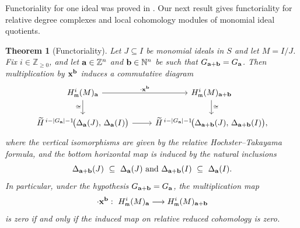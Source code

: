 \documentclass[12pt]{amsart}
\numberwithin{equation}{section}
\newtheorem{theorem}{Theorem}[section]
\theoremstyle{definition}
\theoremstyle{definition}
\def\a{{\bold a}}
\def\b{{\bold b}}
\def\x{{\bold x}}
\begin{document}
Functoriality for one ideal was proved in \cite{MN2011}. Our next result gives functoriality for relative degree complexes and local cohomology modules of monomial ideal quotients.

\begin{theorem}[Functoriality]\label{MainLem}
	Let $J\subseteq I$ be monomial ideals in $S$ and let $M = I/J$.
	Fix $i\in\mathbb Z_{\ge 0}$, and let $\a\in\mathbb Z^n$ and $\b\in\mathbb N^n$ be such that $G_{\a+\b} = G_\a$.
	Then multiplication by $\x^\b$ induces a commutative diagram
	\[
	\begin{tikzcd}
		H^i_{\mathfrak m}(M)_\a
		\arrow[r,"{\cdot \x^\b}"]
		\arrow[d,"\cong"']
		&
		H^i_{\mathfrak m}(M)_{\a+\b}
		\arrow[d,"\cong"]
		\\
		\widetilde H^{\,i-|G_\a|-1}\!
		\big(
		\Delta_\a(J),\,\Delta_\a(I)
		\big)
		\arrow[r]
		&
		\widetilde H^{\,i-|G_\a|-1}\!
		\big(
		\Delta_{\a+\b}(J),\,\Delta_{\a+\b}(I)
		\big),
	\end{tikzcd}
	\]
	where the vertical isomorphisms are given by the relative Hochster--Takayama
	formula, and the bottom horizontal map is induced by the natural inclusions
	\[
	\Delta_{\a+\b}(J)\ \subseteq\ \Delta_\a(J)
	\text{ and }
	\Delta_{\a+\b}(I)\ \subseteq\ \Delta_\a(I).
	\]
	In particular, under the hypothesis $G_{\a+\b}=G_\a$, the multiplication map
	\[
	\cdot \x^\b:\ H^i_{\mathfrak m}(M)_\a \longrightarrow H^i_{\mathfrak m}(M)_{\a+\b}
	\]
	is zero if and only if the induced map on relative reduced cohomology is zero.
\end{theorem}
\end{document}
